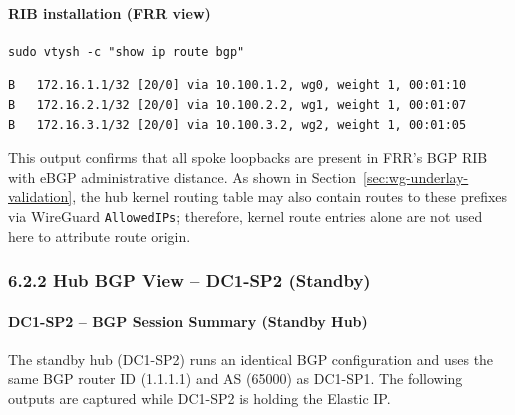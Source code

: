 \documentclass[11pt]{article}
\begin{document}
\paragraph{RIB installation (FRR view)}

\begin{verbatim}
sudo vtysh -c "show ip route bgp"
\end{verbatim}

\begin{verbatim}
B   172.16.1.1/32 [20/0] via 10.100.1.2, wg0, weight 1, 00:01:10
B   172.16.2.1/32 [20/0] via 10.100.2.2, wg1, weight 1, 00:01:07
B   172.16.3.1/32 [20/0] via 10.100.3.2, wg2, weight 1, 00:01:05
\end{verbatim}

This output confirms that all spoke loopbacks are present in FRR’s BGP RIB with eBGP administrative distance. As shown in Section~\ref{sec:wg-underlay-validation}, the hub kernel routing table may also contain routes to these prefixes via WireGuard \texttt{AllowedIPs}; therefore, kernel route entries alone are not used here to attribute route origin.

%
%
%
%
\subsubsection{6.2.2 Hub BGP View -- DC1-SP2 (Standby)}
\label{sec:bgp-overlay-hub-dc1-sp2}

\paragraph{DC1-SP2 -- BGP Session Summary (Standby Hub)}

The standby hub (DC1-SP2) runs an identical BGP configuration and uses the same BGP router ID (1.1.1.1) and AS (65000) as DC1-SP1. The following outputs are captured while DC1-SP2 is holding the Elastic IP.
\end{document}
